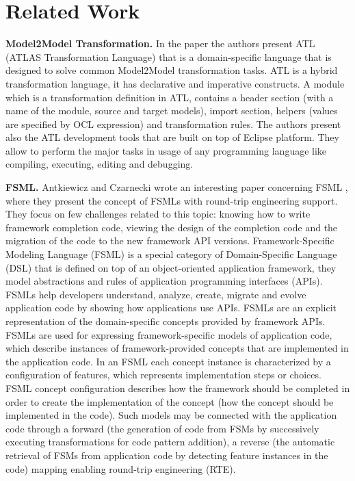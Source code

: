 \section{Related Work}
\label{relatedwork}

\textbf{Model2Model Transformation.} In the paper \cite{atl} the authors present ATL (ATLAS Transformation Language) that is a domain-specific language that is designed to solve common Model2Model transformation tasks. ATL is a hybrid transformation language, it has declarative and imperative constructs. A module which is a transformation definition in ATL, contains a header section (with a name of the module, source and target models), import section, helpers (values are specified by OCL expression) and transformation rules. The authors present also the ATL development tools that are built on top of Eclipse platform. They allow to perform the major tasks in usage of any programming language like compiling, executing, editing and debugging.


\textbf{FSML.} Antkiewicz and Czarnecki wrote an interesting paper concerning FSML \cite{FSML}, where they present the concept of FSMLs with round-trip engineering support. They focus on few challenges related to this topic: knowing how to write framework completion code, viewing the design of the completion code and the migration of the code to the new framework API versions. Framework-Specific Modeling Language (FSML) is a special category of Domain-Specific Language (DSL) that is defined on top of an object-oriented application framework, they model abstractions and rules of application programming interfaces (APIs). FSMLs help developers understand, analyze, create, migrate and evolve application code by showing how applications use APIs. FSMLs are an explicit representation of the domain-specific concepts provided by framework APIs. FSMLs are used for expressing framework-specific models of application code, which describe instances of framework-provided concepts that are implemented in the application code. In an FSML each concept instance is characterized by a configuration of features, which represents implementation steps or choices. FSML concept configuration describes how the framework should be completed in order to create the implementation of the concept (how the concept should be implemented in the code). Such models may be connected with the application code through a forward (the generation of code from FSMs by successively executing transformations for code pattern addition), a reverse (the automatic retrieval of FSMs from application code by detecting feature instances in the code) mapping enabling round-trip engineering (RTE).

